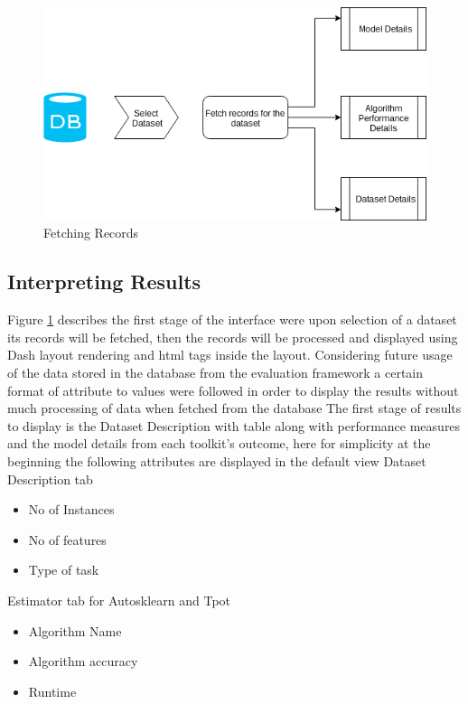 \begin{figure}[!h]
    	\centering
    	\includegraphics[width=0.8\linewidth]{thesis_template/images/Database_fetch.png}
    	\caption{Fetching Records}
    	\label{fig:fetching_records}
        \end{figure}
        



\subsection{Interpreting Results }
Figure \ref{fig:fetching_records} describes the first stage of the interface were upon selection of a dataset its records will be fetched, then the records will be processed and displayed using Dash layout rendering and html tags inside the layout. Considering future usage of the data stored in the database from the evaluation framework a certain format of attribute to values were followed in order to display the results without much processing of data when fetched from the database
The first stage of results to display is the Dataset Description with table along with performance measures and the model details from each toolkit's outcome, here for simplicity at the beginning the following attributes are displayed in the default view
Dataset Description tab
\begin{itemize}
    \item No of Instances
    \item No of features
    \item Type of task
\end{itemize}

Estimator tab for Autosklearn and Tpot
\begin{itemize}
    \item Algorithm Name
    \item Algorithm accuracy
    \item Runtime
\end{itemize}


